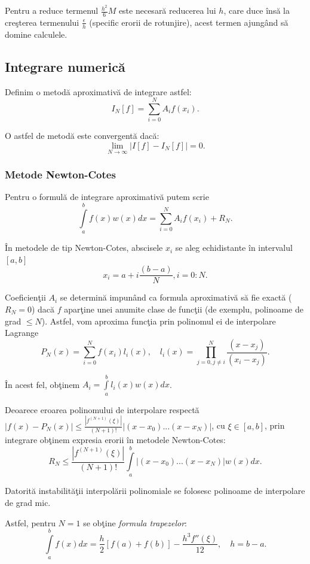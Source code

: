 \documentclass{exam}
\begin{document}
Pentru a reduce termenul $\frac{h^2}{6}M$ este necesar\u{a} reducerea lui $h$, care duce \^{i}ns\u{a} la cre\c{s}terea termenului $\frac{\epsilon}{h}$ (specific erorii de rotunjire), acest termen ajung\^{a}nd s\u{a} domine calculele.

\subsection{Integrare numeric\u{a}}

Definim o metod\u{a} aproximativ\u{a} de integrare astfel:
$$I_N[f]=\sum\limits_{i=0}^{N}A_{i}f(x_{i}).$$

O astfel de metod\u{a} este convergent\u{a} dac\u{a}:
$$\lim\limits_{N\rightarrow \infty} \left|I[f]-I_N[f]\right|=0.$$

\subsubsection{Metode Newton-Cotes}

Pentru o formul\u{a} de integrare aproximativ\u{a} putem scrie
$$\int\limits_{a}^{b}f(x)w(x)dx=\sum\limits_{i=0}^{N}A_{i}f(x_{i})+R_N.$$

\^{I}n metodele de tip Newton-Cotes, abscisele $x_{i}$ se aleg echidistante \^{i}n intervalul $[a, b]$
$$x_{i}=a+i\frac{(b-a)}{N}, i=0:N.$$

Coeficien\c{t}ii $A_{i}$ se determin\u{a} impun\^{a}nd ca formula aproximativ\u{a} s\u{a} fie exact\u{a} ($R_N=0$) dac\u{a} $f$ apar\c{t}ine unei anumite clase de func\c{t}ii (de exemplu, polinoame de grad $\leq N$). Astfel, vom aproxima func\c{t}ia prin polinomul ei de interpolare Lagrange
$$P_N(x) = \sum\limits_{i=0}^{N}f(x_i)l_i(x),  \quad l_i(x) = \prod\limits_{j=0, j \neq i}^{N}\frac{(x-x_j)}{(x_i-x_j)}.$$

\^{I}n acest fel, ob\c{t}inem $A_i=\int\limits_{a}^{b}l_i(x)w(x)dx$.

Deoarece eroarea polinomului de interpolare respect\u{a} $\left|f(x)-P_N(x)\right|\leq\frac{\left|f^{(N+1)}(\xi)\right|}{(N+1)!}\left|(x-x_0) ... (x-x_N)\right|$, cu $\xi\in[a, b]$, prin integrare ob\c{t}inem expresia erorii \^{i}n metodele Newton-Cotes:
$$R_N\leq\frac{\left|f^{(N+1)}(\xi)\right|}{(N+1)!}\int\limits_{a}^{b}\left|(x-x_0) ... (x-x_N)\right|w(x)dx.$$

Datorit\u{a} instabilit\u{a}\c{t}ii interpol\u{a}rii polinomiale se folosesc polinoame de interpolare de grad mic.

Astfel, pentru $N=1$ se ob\c{t}ine \textit{formula trapezelor}:
$$\int\limits_{a}^{b}f(x)dx=\frac{h}{2}\left[f(a)+f(b)\right]-\frac{h^3f''(\xi)}{12}, \quad h = b-a.$$
\end{document}
